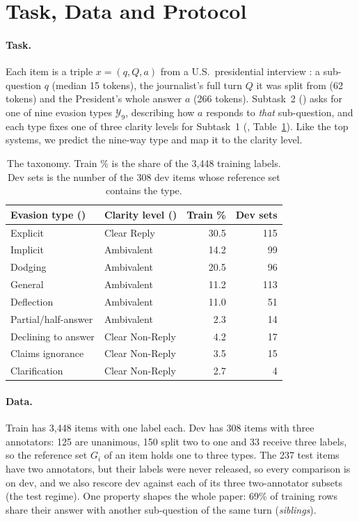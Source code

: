\section{Task, Data and Protocol}
\label{sec:task}
\FigureSystem

\paragraph{Task.}
Each item is a triple $x = (q, Q, a)$ from a U.S.\ presidential interview \citep{thomas-etal-2024-never}: a sub-question $q$ (median 15 tokens), the journalist's full turn $Q$ it was split from (62 tokens) and the President's whole answer $a$ (266 tokens).
Subtask~2 (\Stwo{}) asks for one of nine evasion types $\mathcal{Y}_9$, describing how $a$ responds to \emph{that} sub-question, and each type fixes one of three clarity levels for Subtask~1 (\Sone{}, Table~\ref{tab:taxonomy}).
Like the top systems, we predict the nine-way type and map it to the clarity level.

\begin{table}[t]
\centering
\small
\setlength{\tabcolsep}{3.5pt}
\begin{tabular}{@{}llrr@{}}
\toprule
Evasion type (\Stwo{}) & Clarity level (\Sone{}) & Train \% & Dev sets \\
\midrule
Explicit            & Clear Reply     & 30.5 & 115 \\
\midrule
Implicit            & Ambivalent      & 14.2 & 99 \\
Dodging             & Ambivalent      & 20.5 & 96 \\
General             & Ambivalent      & 11.2 & 113 \\
Deflection          & Ambivalent      & 11.0 & 51 \\
Partial/half-answer & Ambivalent      & 2.3  & 14 \\
\midrule
Declining to answer & Clear Non-Reply & 4.2  & 17 \\
Claims ignorance    & Clear Non-Reply & 3.5  & 15 \\
Clarification       & Clear Non-Reply & 2.7  & 4 \\
\bottomrule
\end{tabular}
\caption{The taxonomy. Train \% is the share of the 3,448 training labels. Dev sets is the number of the 308 dev items whose reference set contains the type.}
\label{tab:taxonomy}
\end{table}

\paragraph{Data.}
Train has 3,448 items with one label each.
Dev has 308 items with three annotators: 125 are unanimous, 150 split two to one and 33 receive three labels, so the reference set $G_i$ of an item holds one to three types.
The 237 test items have two annotators, but their labels were never released, so every comparison is on dev, and we also rescore dev against each of its three two-annotator subsets (the test regime).
One property shapes the whole paper: 69\% of training rows share their answer with another sub-question of the same turn (\emph{siblings}).


